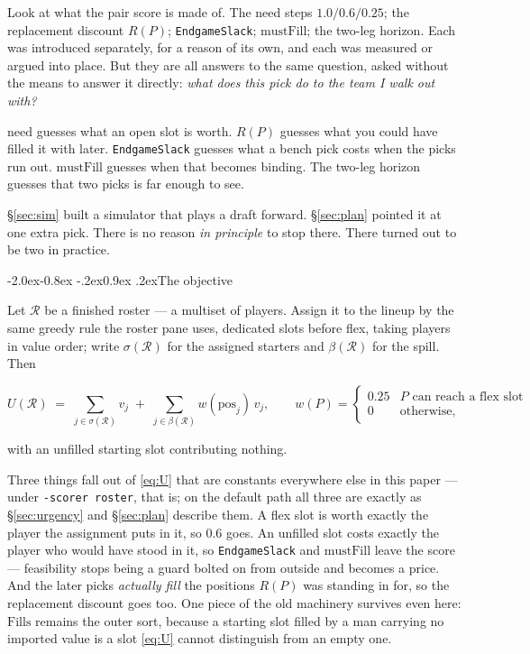 \documentclass[10pt,a4paper]{article}
\makeatletter
\theoremstyle{plain}
\theoremstyle{definition}
\theoremstyle{remark}
\newcommand{\code}[1]{\texttt{\small #1}}
\renewcommand\subsection{\@startsection{subsection}{2}{\z@}%
  {-2.0ex\@plus -0.8ex \@minus -.2ex}{0.9ex \@plus .2ex}{\normalfont\large\bfseries}}
\makeatother
\begin{document}
Look at what the pair score is made of. The need steps $1.0 / 0.6 / 0.25$; the replacement
discount $R(P)$; \code{EndgameSlack}; $\mathrm{mustFill}$; the two-leg horizon. Each was
introduced separately, for a reason of its own, and each was measured or argued into place.
But they are all answers to the same question, asked without the means to answer it
directly: \emph{what does this pick do to the team I walk out with?}

$\mathrm{need}$ guesses what an open slot is worth. $R(P)$ guesses what you could have
filled it with later. \code{EndgameSlack} guesses what a bench pick costs when the picks
run out. $\mathrm{mustFill}$ guesses when that becomes binding. The two-leg horizon guesses
that two picks is far enough to see.

\S\ref{sec:sim} built a simulator that plays a draft forward. \S\ref{sec:plan} pointed it
at one extra pick. There is no reason \emph{in principle} to stop there. There turned out
to be two in practice.

\subsection{The objective}

Let $\mathcal{R}$ be a finished roster --- a multiset of players. Assign it to the lineup
by the same greedy rule the roster pane uses, dedicated slots before flex, taking players
in value order; write $\sigma(\mathcal{R})$ for the assigned starters and
$\beta(\mathcal{R})$ for the spill. Then

\begin{equation}
U(\mathcal{R}) \;=\; \sum_{j \in \sigma(\mathcal{R})} v_j
\;+\; \sum_{j \in \beta(\mathcal{R})} w(\mathrm{pos}_j)\, v_j ,
\qquad
w(P) = \begin{cases} 0.25 & P \text{ can reach a flex slot} \\ 0 & \text{otherwise,}\end{cases}
\label{eq:U}
\end{equation}

with an unfilled starting slot contributing nothing.

Three things fall out of \eqref{eq:U} that are constants everywhere else in this paper ---
under \code{-scorer roster}, that is; on the default path all three are exactly as
\S\ref{sec:urgency} and \S\ref{sec:plan} describe them. A flex slot is worth exactly the
player the assignment puts in it, so $0.6$ goes. An unfilled slot costs exactly the player
who would have stood in it, so \code{EndgameSlack} and $\mathrm{mustFill}$ leave the score
--- feasibility stops being a guard bolted on from outside and becomes a price. And the
later picks \emph{actually fill} the positions $R(P)$ was standing in for, so the
replacement discount goes too. One piece of the old machinery survives even here:
$\mathrm{Fills}$ remains the outer sort, because a starting slot filled by a man carrying
no imported value is a slot \eqref{eq:U} cannot distinguish from an empty one.
\end{document}
